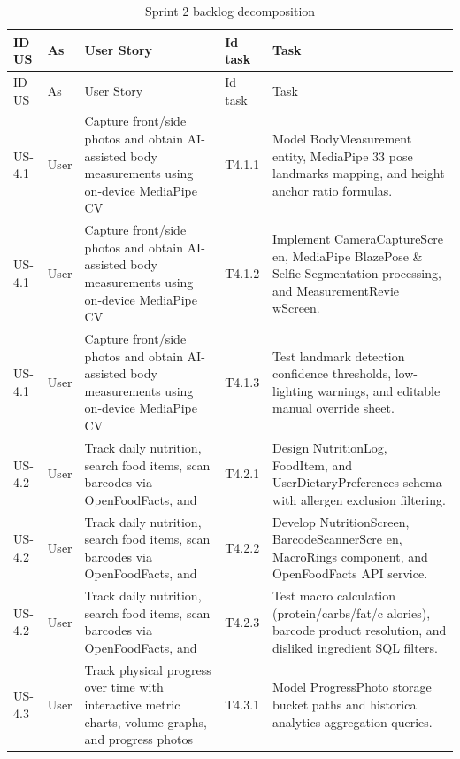 \documentclass[12pt,a4paper,openany]{report}
\begin{document}
\begingroup
\scriptsize
\setlength{\tabcolsep}{3pt}
\renewcommand{\arraystretch}{1.20}
\setlength{\LTpre}{5pt}
\setlength{\LTpost}{10pt}
\begin{longtable}{|L{1.20cm}|L{2.00cm}|L{5.40cm}|L{1.80cm}|L{4.00cm}|}
\caption{Sprint 2 backlog decomposition}\label{tab:pdf-45-22} \\
\hline
{}
ID US & As & User Story & Id task & Task \\ \hline
\endfirsthead
\hline
{}
ID US & As & User Story & Id task & Task \\ \hline
\endhead
US-4.1 & User & Capture front/side photos and obtain AI-assisted body measurements using on-device MediaPipe CV & T4.1.1 & Model BodyMeasurement entity, MediaPipe 33 pose landmarks mapping, and height anchor ratio formulas. \\ \hline
US-4.1 & User & Capture front/side photos and obtain AI-assisted body measurements using on-device MediaPipe CV & T4.1.2 & Implement CameraCaptureScre en, MediaPipe BlazePose \& Selfie Segmentation processing, and MeasurementRevie wScreen. \\ \hline
US-4.1 & User & Capture front/side photos and obtain AI-assisted body measurements using on-device MediaPipe CV & T4.1.3 & Test landmark detection confidence thresholds, low-lighting warnings, and editable manual override sheet. \\ \hline
US-4.2 & User & Track daily nutrition, search food items, scan barcodes via OpenFoodFacts, and  & T4.2.1 & Design NutritionLog, FoodItem, and UserDietaryPreferences schema with allergen exclusion filtering. \\ \hline
US-4.2 & User & Track daily nutrition, search food items, scan barcodes via OpenFoodFacts, and  & T4.2.2 & Develop NutritionScreen, BarcodeScannerScre en, MacroRings component, and OpenFoodFacts API service. \\ \hline
US-4.2 & User & Track daily nutrition, search food items, scan barcodes via OpenFoodFacts, and  & T4.2.3 & Test macro calculation (protein/carbs/fat/c alories), barcode product resolution, and disliked ingredient SQL filters. \\ \hline
US-4.3 & User & Track physical progress over time with interactive metric charts, volume graphs, and progress photos & T4.3.1 & Model ProgressPhoto storage bucket paths and historical analytics aggregation queries. \\ \hline

\end{longtable}
\end{document}
